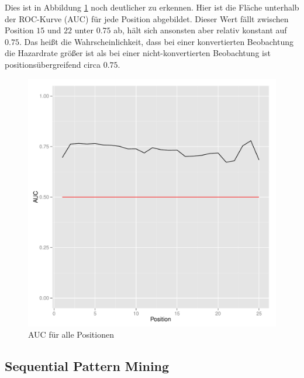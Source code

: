 Dies ist in Abbildung \ref{auc} noch deutlicher zu erkennen. Hier ist die Fläche unterhalb der ROC-Kurve (AUC) für jede Position abgebildet. Dieser Wert fällt zwischen Position $15$ und $22$ unter $0.75$ ab, hält sich ansonsten aber relativ konstant auf $0.75$. Das heißt die Wahrscheinlichkeit, dass bei einer konvertierten Beobachtung die Hazardrate größer ist als bei einer nicht-konvertierten Beobachtung ist positionsübergreifend circa $0.75$.
\begin{figure}[H]
	\centering\includegraphics[scale=0.6]{auc.pdf}\caption[AUC-Wert]{AUC für alle Positionen}\label{auc}
\end{figure}

\subsection{Sequential Pattern Mining}\label{ergspm}

